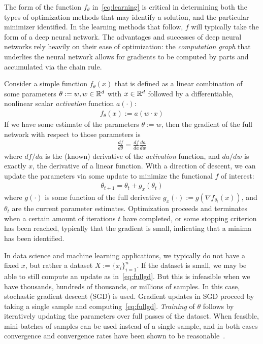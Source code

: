 The form of the function $f_\theta$ in~\eqref{eq:learning}
is critical in determining both
the types of optimization methods
that may identify a solution,
and the particular minimizer identified.
In the learning methods that follow,
$f$ will typically take the form of 
a deep neural network.
The advantages
and successes of deep neural networks
rely heavily on their ease of optimization:
the \textit{computation graph} that 
underlies the neural network
allows for gradients
to be computed by parts
and accumulated via the chain rule.

Consider a simple function $f_\theta(x)$
that is defined as a linear combination of 
some parameters $\theta:=w, w\in \mathbb{R}^d$ with $x\in \mathbb{R}^d$ followed by 
a differentiable, nonlinear scalar \textit{activation} function $a(\cdot)$:
\begin{align}\label{eq:wx}
	f_\theta(x) := a(w\cdot x)
\end{align}
If we have some estimate of the parameters $\theta:=w$,
then the gradient of the full network with respect to those parameters is
\begin{align}
	\frac{df}{d\theta} = \frac{df}{da}\frac{da}{dw}
\end{align}
where $df/da$ is the (known) derivative of the \textit{activation} function,
and $da/dw$ is exactly $x$, the derivative of a linear function.
With a direction of descent,
we can update the parameters via some update to minimize the functional $f$ of interest:
\begin{align}\label{eq:fullgd}
	\theta_{t+1} = \theta_t + g_x(\theta_t)
\end{align}
where $g(\cdot)$ is some function of the full derivative $g_x(\cdot) := g(\nabla f_{\theta_t}(x))$,
and $\theta_t$ are the current parameter estimates.
Optimization proceeds and terminates when a certain amount
of iterations $t$ have completed,
or some stopping criterion has been reached,
typically that the gradient is small,
indicating that a minima has been identified.

In data science and machine learning applications,
we typically do not have a fixed $x$, but 
rather a dataset $X:=\{x_i\}_{i=1}^n$.
If the dataset is small,
we may be able to still compute an update as in~\eqref{eq:fullgd}.
But this is infeasible when we have thousands,
hundreds of thousands, or millions of samples.
In this case,
stochastic gradient descent (SGD) is used.
Gradient updates in SGD proceed
by taking a single sample and computing~\eqref{eq:fullgd}.
\textit{Training} of $\theta$
follows by iteratively updating the parameters
over full passes of the dataset.
When feasible, mini-batches of samples can
be used instead of a single sample,
and in both cases convergence and convergence
rates have been shown to be reasonable~\citep{hardt2016train}.

